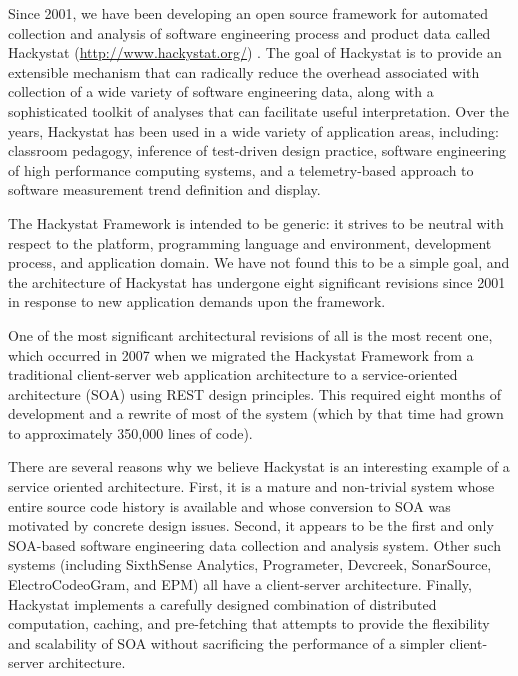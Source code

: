 \documentclass[conference,compsoc]{IEEEtran}
\begin{document}
Since 2001, we have been developing an open source framework for automated
collection and analysis of software engineering process and product data
called Hackystat (\url{http://www.hackystat.org/})
\cite{csdl2-06-06,csdl2-02-07}.  The goal of Hackystat is to provide an
extensible mechanism that can radically reduce the overhead associated with
collection of a wide variety of software engineering data, along with a
sophisticated toolkit of analyses that can facilitate useful
interpretation.  Over the years, Hackystat has been used in a wide variety
of application areas, including: classroom pedagogy,
inference of test-driven design practice, software
engineering of high performance computing systems, and a
telemetry-based approach to software measurement trend definition and
display.

The Hackystat Framework is intended to be generic: it strives to be neutral
with respect to the platform, programming language and environment,
development process, and application domain.  We have not found this to be
a simple goal, and the architecture of Hackystat has undergone eight
significant revisions since 2001 in response to new application demands
upon the framework.

One of the most significant architectural revisions of all is the most
recent one, which occurred in 2007 when we migrated the Hackystat Framework
from a traditional client-server web application architecture to a
service-oriented architecture (SOA) using REST design principles.  This
required eight months of development and a rewrite of most of the system
(which by that time had grown to approximately 350,000 lines of code).

There are several reasons why we believe Hackystat is an interesting
example of a service oriented architecture.  First, it is a mature and
non-trivial system whose entire source code history is available and whose
conversion to SOA was motivated by concrete design issues.  Second, it
appears to be the first and only SOA-based software engineering data
collection and analysis system.  Other such systems (including SixthSense
Analytics, Programeter, Devcreek, SonarSource, ElectroCodeoGram, and EPM)
all have a client-server architecture.  Finally, Hackystat implements a
carefully designed combination of distributed computation, caching, and
pre-fetching that attempts to provide the flexibility and scalability of
SOA without sacrificing the performance of a simpler client-server
architecture.
\end{document}
